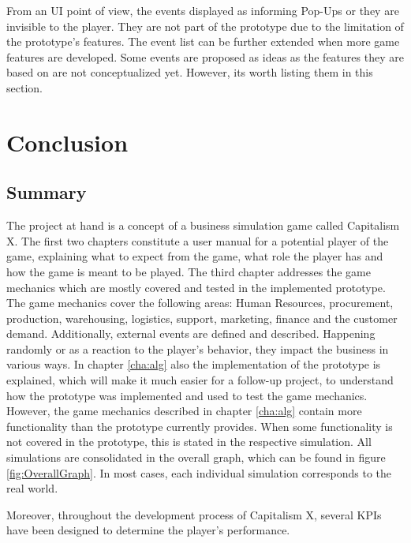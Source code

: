 \documentclass[11pt,titlepage,oneside,openany]{book}
\begin{document}
From an UI point of view, the events displayed as informing Pop-Ups or they are invisible to the player. They are not part of the prototype due to the limitation of the prototype's features. The event list can be further extended when more game features are developed. Some events are proposed as ideas as the features they are based on are not conceptualized yet. However, its worth listing them in this section. 



\chapter{Conclusion}
\label{sec:conclusion}

\section{Summary}
\label{sec:summary}
The project at hand is a concept of a business simulation game called Capitalism X. The first two chapters constitute a user manual for a potential player of the game, explaining what to expect from the  game, what role the player has and how the game is meant to be played. The third chapter addresses the game mechanics which are mostly covered and tested in the implemented prototype. The game mechanics cover the following areas: Human Resources, procurement, production, warehousing, logistics, support, marketing, finance and the customer demand. Additionally, external events are defined and described. Happening randomly or as a reaction to the player's behavior, they impact the business in various ways. 
In chapter \ref{cha:alg} also the implementation of the prototype is explained, which will make it much easier for a follow-up project, to understand how the prototype was implemented and used to test the game mechanics. 
However, the game mechanics described in chapter \ref{cha:alg} contain more functionality than the prototype currently provides. When some functionality is not covered in the prototype, this is stated in the respective simulation. All simulations are consolidated in the overall graph, which can be found in figure \ref{fig:OverallGraph}. In most cases, each individual simulation corresponds to the real world.

Moreover, throughout the development process of Capitalism X, several KPIs have been designed to determine the player's performance.

\end{document}

